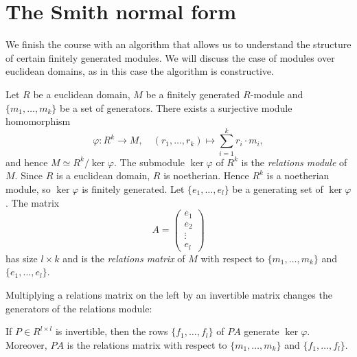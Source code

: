 \section{The Smith normal form}
\lecture\label{lec:Smith}

We finish the course with an algorithm that allows us to understand the
structure of certain finitely generated modules.  We will discuss the case of
modules over euclidean domains, as in this case the algorithm is constructive. 

Let $R$ be a euclidean domain, 
$M$ be a finitely generated $R$-module and $\{m_1,\dots,m_k\}$ be a set of
generators.  There exists a surjective module homomorphism 
\[
	\varphi\colon R^k\to M, 
	\quad
	(r_1,\dots,r_k)\mapsto \sum_{i=1}^k r_i\cdot m_i,
\]
and hence 
$M\simeq R^k/\ker\varphi$. 
The submodule $\ker\varphi$ of $R^k$ is the \emph{relations module} of $M$. 
Since $R$ is a euclidean domain, $R$ is noetherian. Hence $R^k$ is a noetherian 
module, so 
$\ker\varphi$ is finitely generated. Let 
$\{e_1,\dots,e_l\}$ be a generating set of $\ker\varphi$. 
The matrix  
\[
A=\begin{pmatrix}
e_1\\
e_2\\
\vdots\\
e_l
\end{pmatrix}
\]
has size $l\times k$ and 
is the 
\emph{relations matrix} of $M$ with respect to $\{m_1,\dots,m_k\}$ 
and $\{e_1,\dots,e_l\}$. 

Multiplying a relations matrix 
on the left by an invertible matrix changes the generators of the relations module: 

\begin{claim}
		If $P\in R^{l\times l}$ is invertible, then the rows
		$\{f_1,\dots,f_l\}$ of $PA$ generate $\ker\varphi$. Moreover, $PA$ is
		the relations matrix with respect to $\{m_1,\dots,m_k\}$ and
		$\{f_1,\dots,f_l\}$. 
\end{claim}


